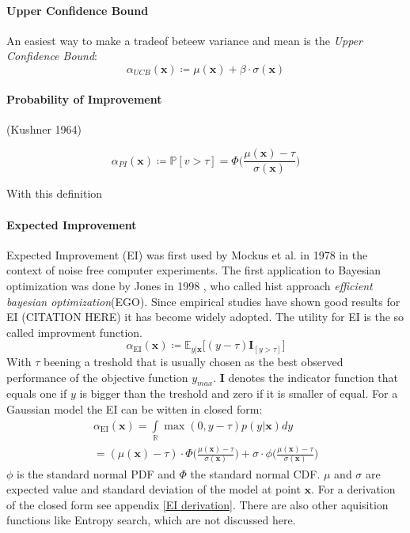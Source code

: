\documentclass[english]{article}
\newcommand{\EI}{\operatorname{EI}}
\newcommand{\x}{\mathbf{x}}
\newcommand{\E}{\mathbb{E}}
\begin{document}
\paragraph{Upper Confidence Bound}
An easiest way to make a tradeof beteew variance and mean is the \textit{Upper Confidence Bound}:
\begin{equation}
  \alpha_{UCB}(\x) \coloneqq \mu(\x) + \beta \cdot \sigma(\x)
\end{equation}

\paragraph{Probability of Improvement}

(Kushner 1964)

\begin{equation}
  \alpha_{PI}(\x) \coloneqq \mathbb{P}[v>\tau] = \Phi\bigg(\frac{\mu(\x)-\tau}{\sigma(\x)}\bigg)
\end{equation}

With this definition

\paragraph{Expected Improvement}
Expected Improvement (EI) was first used by Mockus et al. in 1978 \cite{mockus_application_1978} in the context of noise free computer experiments. The first application to Bayesian optimization was done by Jones in 1998 \cite{jones_efficient_1998}, who called hist approach \textit{efficient bayesian optimization}(EGO). Since empirical studies have shown good results for EI (CITATION HERE) it has become widely adopted. The utility for EI is the so called improvment function.
\begin{equation}
  \alpha_{\EI}(\x) \coloneqq \E_{y|\x}\big[(y - \tau)\mathbf{I}_{[y > \tau]}\big]
\end{equation}
With $\tau$ beening a treshold that is usually chosen as the best observed performance of the objective function $y_{max}$. $\mathbf{I}$ denotes the indicator function that equals one if $y$ is bigger than the treshold and zero if it is smaller of equal. For a Gaussian model the EI can be witten in closed form:
\begin{equation}
  \begin{split}
    \alpha_{\EI}(\x) = \int\limits_{\mathbb{R}} \max(0, y-\tau)p(y|\x)dy
    \\
    = (\mu(\x) - \tau) \cdot \Phi \bigg(\frac{\mu(\x)-\tau}{\sigma(\x)}\bigg) + \sigma \cdot \phi \bigg(\frac{\mu(\x)-\tau}{\sigma(\x)}\bigg)
  \end{split}
\end{equation}
$\phi$ is the standard normal PDF and $\Phi$ the standard normal CDF. $\mu$ and $\sigma$ are expected value and standard deviation of the model at point $\x$.
For a derivation of the closed form see appendix \ref{EI derivation}.
There are also other aquisition functions like Entropy search, which are not discussed here.
\end{document}

